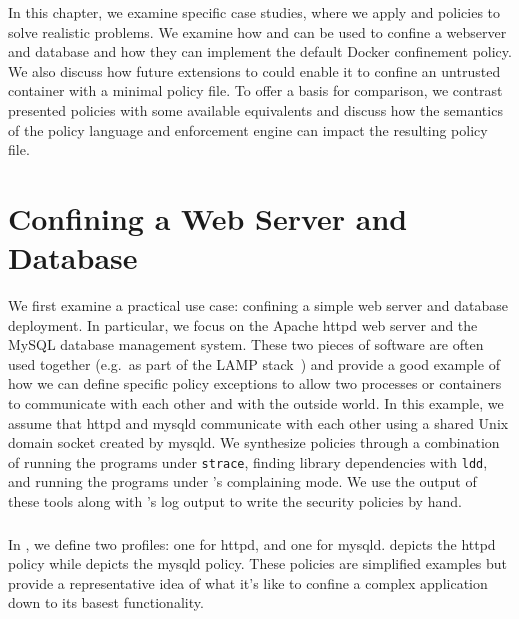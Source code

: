 In this chapter, we examine specific case studies, where we apply \bpfbox{} and
\bpfcontain{} policies to solve realistic problems. We examine how \bpfbox{} and
\bpfcontain{} can be used to confine a webserver and database and how they can implement
the default Docker confinement policy.  We also discuss how future extensions to
\bpfcontain{} could enable it to confine an untrusted container with a minimal policy file.
To offer a basis for comparison, we contrast presented policies with some available
equivalents and discuss how the semantics of the policy language and enforcement engine
can impact the resulting policy file.


%
\section{Confining a Web Server and Database}

We first examine a practical use case: confining a simple web server and database
deployment. In particular, we focus on the Apache httpd web server and the MySQL database
management system. These two pieces of software are often used together (e.g.\ as part of
the LAMP stack~\cite{lamp}) and provide a good example of how we can define specific
policy exceptions to allow two processes or containers to communicate with each other and
with the outside world. In this example, we assume that httpd and mysqld communicate with
each other using a shared Unix domain socket created by mysqld. We synthesize policies
through a combination of running the programs under \texttt{strace}, finding library
dependencies with \texttt{ldd}, and running the programs under \bpfcontain{}'s complaining
mode. We use the output of these tools along with \bpfcontain{}'s log output to write
the security policies by hand.

\subsubsection{\bpfbox{}}

In \bpfbox{}, we define two profiles: one for httpd, and one for mysqld.
 depicts the httpd policy while  depicts
the mysqld policy. These policies are simplified examples but provide a representative
idea of what it's like to confine a complex application down to its basest functionality.

